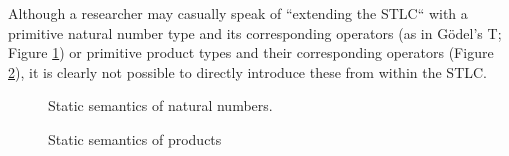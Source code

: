 Although a researcher may casually speak of ``extending the STLC`` with a primitive natural number type and its corresponding operators (as in G\"odel's T; Figure \ref{nat-statics}) or primitive product types and their  corresponding operators (Figure \ref{pair-statics}), it is clearly not possible to directly introduce these from within the STLC.
\begin{figure}[h]
\small
\vspace{-8pt}
\begin{mathpar}


\end{mathpar}
\vspace{-8pt}
\caption{Static semantics of natural numbers.}\label{nat-statics}
\vspace{-15pt}
\end{figure}
\begin{figure}[h]
\small
\begin{mathpar}


\end{mathpar}
\vspace{-8pt}
\caption{Static semantics of products}\label{pair-statics}
\end{figure}


